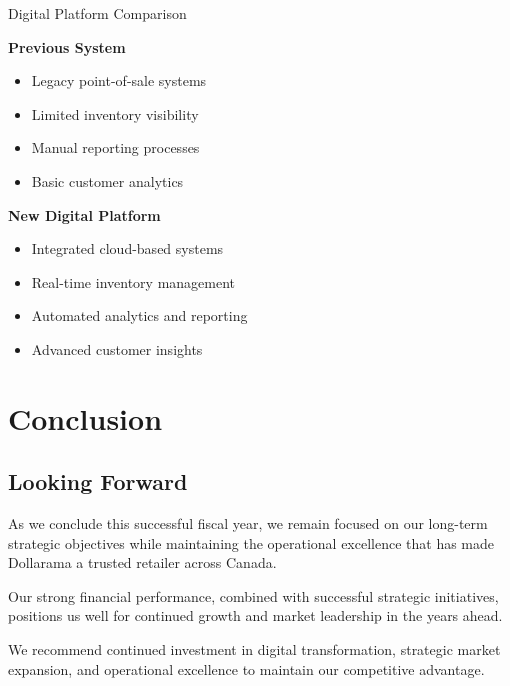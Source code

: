 \documentclass{dollarama}
\begin{document}
\begin{dollaramacomparison}{Digital Platform Comparison}

\textbf{Previous System}
\begin{itemize}
\item Legacy point-of-sale systems
\item Limited inventory visibility
\item Manual reporting processes
\item Basic customer analytics
\end{itemize}

\vscompare

\textbf{New Digital Platform}
\begin{itemize}
\item Integrated cloud-based systems
\item Real-time inventory management
\item Automated analytics and reporting
\item Advanced customer insights
\end{itemize}

\end{dollaramacomparison}

\clearpage



\section{Conclusion}

\subsection{Looking Forward}

As we conclude this successful fiscal year, we remain focused on our long-term strategic objectives while maintaining the operational excellence that has made Dollarama a trusted retailer across Canada.

Our strong financial performance, combined with successful strategic initiatives, positions us well for continued growth and market leadership in the years ahead.

\begin{dollaramarecommendations}{
    We recommend continued investment in digital transformation, strategic market expansion, and operational excellence to maintain our competitive advantage.
}
\end{dollaramarecommendations}
\end{document}
